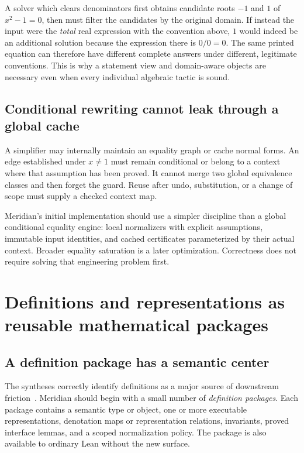 \documentclass[11pt,a4paper]{article}
\theoremstyle{remark}
\begin{document}
A solver which clears denominators first obtains candidate roots $-1$ and $1$
of $x^2-1=0$, then must filter the candidates by the original domain. If instead
the input were the \emph{total} real expression with the convention above, $1$
would indeed be an additional solution because the expression there is $0/0=0$.
The same printed equation can therefore have different complete answers under
different, legitimate conventions. This is why a statement view and domain-aware
objects are necessary even when every individual algebraic tactic is sound.

\subsection{Conditional rewriting cannot leak through a global cache}
A simplifier may internally maintain an equality graph or cache normal forms.
An edge established under $x\ne1$ must remain conditional or belong to a context
where that assumption has been proved. It cannot merge two global equivalence
classes and then forget the guard. Reuse after undo, substitution, or a change of
scope must supply a checked context map.

Meridian's initial implementation should use a simpler discipline than a global
conditional equality engine: local normalizers with explicit assumptions,
immutable input identities, and cached certificates parameterized by their
actual context. Broader equality saturation is a later optimization. Correctness
does not require solving that engineering problem first.

\section{Definitions and representations as reusable mathematical packages}
\label{sec:views}
\subsection{A definition package has a semantic center}
The syntheses correctly identify definitions as a major source of downstream
friction~\cite{synA,synB}. Meridian should begin with a small number of
\emph{definition packages}. Each package contains a semantic type or object,
one or more executable representations, denotation maps or representation
relations, invariants, proved interface lemmas, and a scoped normalization policy.
The package is also available to ordinary Lean without the new surface.
\end{document}
